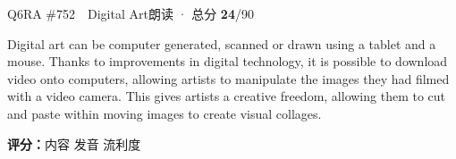 \begin{qblock}{Q6\quad RA \#752\ \ Digital Art}{朗读 · 总分 \textcolor{cAccent}{\bfseries 24}/90}
\begin{promptbox}
Digital art can be computer generated, scanned or drawn using a tablet and a mouse. Thanks to improvements in digital technology, it is possible to download video onto computers, allowing artists to manipulate the images they had filmed with a video camera. This gives artists a creative freedom, allowing them to cut and paste within moving images to create visual collages.
\end{promptbox}
\asrlegend
\begin{asrbox}
      \pse {}              \pse {} \pse {}     \pse {}   \pse {}      \pse {}             \pse {}     \pse {}       
\end{asrbox}
\smallskip
{\small\textbf{评分：}内容  \quad\textperiodcentered\quad 发音  \quad\textperiodcentered\quad 流利度 }
\end{qblock}


